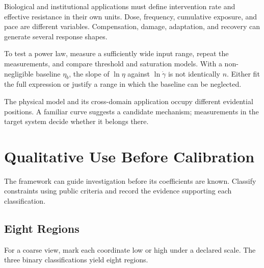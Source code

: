 \documentclass[11pt,openany]{book}
\begin{document}
Biological and institutional applications must define intervention rate and effective resistance in their own units. Dose, frequency, cumulative exposure, and pace are different variables. Compensation, damage, adaptation, and recovery can generate several response shapes.

To test a power law, measure a sufficiently wide input range, repeat the measurements, and compare threshold and saturation models. With a non-negligible baseline $\eta_b$, the slope of $\ln\eta$ against $\ln\dot\gamma$ is not identically $n$. Either fit the full expression or justify a range in which the baseline can be neglected.

The physical model and its cross-domain application occupy different evidential positions. A familiar curve suggests a candidate mechanism; measurements in the target system decide whether it belongs there.

\section{Qualitative Use Before Calibration}

The framework can guide investigation before its coefficients are known. Classify constraints using public criteria and record the evidence supporting each classification.

\subsection{Eight Regions}

For a coarse view, mark each coordinate low or high under a declared scale. The three binary classifications yield eight regions.
\end{document}

